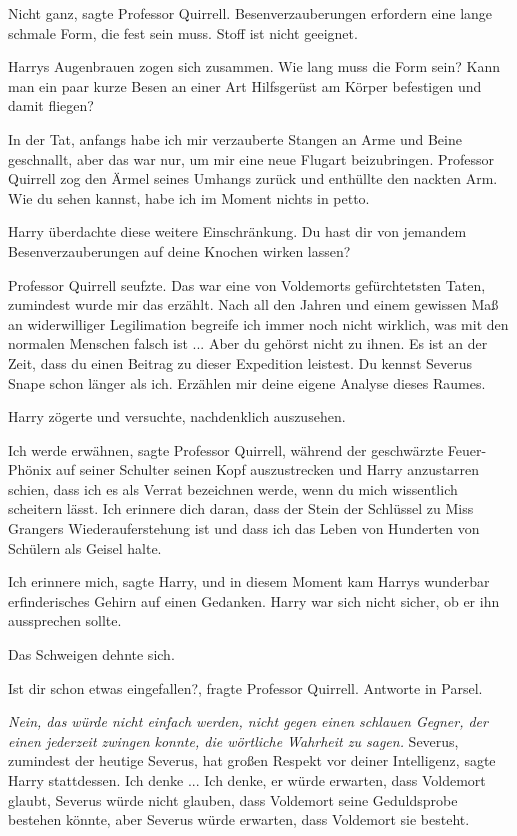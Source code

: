\glqq{}Nicht ganz\grqq{}, sagte Professor Quirrell. \glqq{}Besenverzauberungen
erfordern eine lange schmale Form, die fest sein muss. Stoff ist nicht
geeignet.\grqq{}

Harrys Augenbrauen zogen sich zusammen. \glqq{}Wie lang muss die Form sein? Kann
man ein paar kurze Besen an einer Art Hilfsgerüst am Körper befestigen und damit
fliegen?\grqq{}

\glqq{}In der Tat, anfangs habe ich mir verzauberte Stangen an Arme und Beine
geschnallt, aber das war nur, um mir eine neue Flugart beizubringen.\grqq{} Professor
Quirrell zog den Ärmel seines Umhangs zurück und enthüllte den nackten Arm.
\glqq{}Wie du sehen kannst, habe ich im Moment nichts in petto.\grqq{}

Harry überdachte diese weitere Einschränkung. \glqq{}Du hast dir von jemandem
Besenverzauberungen auf deine Knochen wirken lassen?\grqq{}

Professor Quirrell seufzte. \glqq{}Das war eine von Voldemorts gefürchtetsten
Taten, zumindest wurde mir das erzählt. Nach all den Jahren und einem gewissen
Maß an widerwilliger Legilimation begreife ich immer noch nicht wirklich, was
mit den normalen Menschen falsch ist ... Aber du gehörst nicht zu ihnen. Es ist
an der Zeit, dass du einen Beitrag zu dieser Expedition leistest. Du kennst
Severus Snape schon länger als ich. Erzählen mir deine eigene Analyse dieses
Raumes.\grqq{}

Harry zögerte und versuchte, nachdenklich auszusehen.

\glqq{}Ich werde erwähnen\grqq{}, sagte Professor Quirrell, während der
geschwärzte Feuer-Phönix auf seiner Schulter seinen Kopf auszustrecken und Harry
anzustarren schien, \glqq{}dass ich es als Verrat bezeichnen werde, wenn du mich
wissentlich scheitern lässt. Ich erinnere dich daran, dass der Stein der
Schlüssel zu Miss Grangers Wiederauferstehung ist und dass ich das Leben von
Hunderten von Schülern als Geisel halte.\grqq{}

\glqq{}Ich erinnere mich\grqq{}, sagte Harry, und in diesem Moment kam Harrys
wunderbar erfinderisches Gehirn auf einen Gedanken. Harry war sich nicht sicher,
ob er ihn aussprechen sollte.

Das Schweigen dehnte sich.

\glqq{}Ist dir schon etwas eingefallen?\grqq{}, fragte Professor Quirrell. \glqq{}
Antworte in Parsel.\grqq{}

\emph{Nein, das würde nicht einfach werden, nicht gegen einen schlauen Gegner,
der einen jederzeit zwingen konnte, die wörtliche Wahrheit zu sagen.} \glqq{}
Severus, zumindest der heutige Severus, hat großen Respekt vor deiner
Intelligenz\grqq{}, sagte Harry stattdessen. \glqq{}Ich denke ... Ich denke, er
würde erwarten, dass Voldemort glaubt, Severus würde nicht glauben, dass
Voldemort seine Geduldsprobe bestehen könnte, aber Severus würde erwarten, dass
Voldemort sie besteht.\grqq{}

